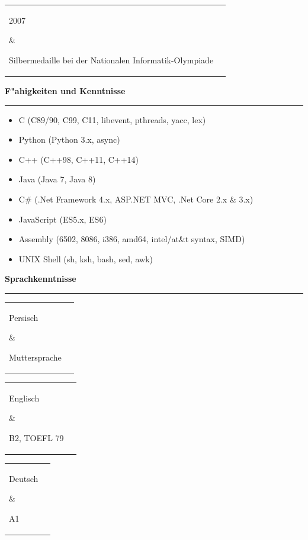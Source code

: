 \documentclass[11pt,a4paper,oneside]{article}
\makeatletter
\renewcommand{\section}[1]{%
{\large\textbf{#1}}\\
\rule[9pt]{18cm}{.4pt}\vspace{-16pt}%
}
\newenvironment{mytable}{%
\begin{tabular}{@{}l@{\hspace{4mm}}l@{}}%
}{\end{tabular}}
\newcommand{\myitem}[2]{%
\parbox[t]{16mm}{#1}&\parbox[t]{16cm}{#2}\\%
}
\makeatother
\begin{document}
\begin{mytable}\myitem{2007}{
Silbermedaille bei der Nationalen Informatik-Olympiade
}\end{mytable}

\section{F"ahigkeiten und Kenntnisse}
\begin{itemize}
\item C (C89/90, C99, C11, libevent, pthreads, yacc, lex)
\item Python (Python 3.x, async)
\item C++ (C++98, C++11, C++14)
\item Java (Java 7, Java 8)
\item C\# (.Net Framework 4.x, ASP.NET MVC, .Net Core 2.x \& 3.x)
\item JavaScript (ES5.x, ES6)
\item Assembly (6502, 8086, i386, amd64, intel/at\&t syntax, SIMD)
\item UNIX Shell (sh, ksh, bash, sed, awk)
\end{itemize}

\section{Sprachkenntnisse}

\begin{mytable}\myitem{Persisch}{
	Muttersprache
}\end{mytable}

\begin{mytable}\myitem{Englisch}{
	B2, TOEFL 79
}\end{mytable}

\begin{mytable}\myitem{Deutsch}{
	A1
}\end{mytable}
\end{document}
